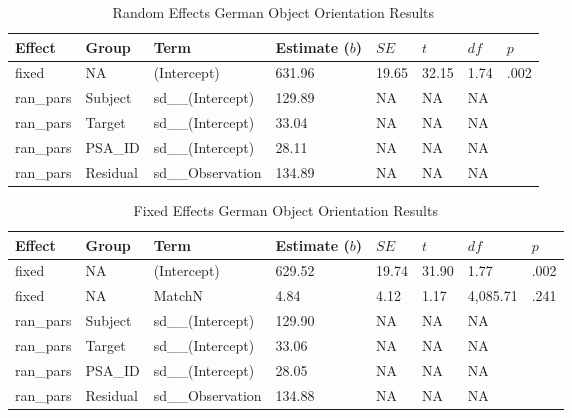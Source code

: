 \documentclass[
  man,mask,floatsintext]{apa7}
\begin{document}
\begin{table}[tbp]

\begin{center}
\begin{threeparttable}

\caption{\label{tab:german-random}Random Effects German Object Orientation Results}

\begin{tabular}{llllllll}
\toprule
Effect & Group & Term & Estimate ($b$) & $SE$ & $t$ & $df$ & $p$\\
\midrule
fixed & NA & (Intercept) & 631.96 & 19.65 & 32.15 & 1.74 & .002\\
ran\_pars & Subject & sd\_\_(Intercept) & 129.89 & NA & NA & NA & \\
ran\_pars & Target & sd\_\_(Intercept) & 33.04 & NA & NA & NA & \\
ran\_pars & PSA\_ID & sd\_\_(Intercept) & 28.11 & NA & NA & NA & \\
ran\_pars & Residual & sd\_\_Observation & 134.89 & NA & NA & NA & \\
\bottomrule
\end{tabular}

\end{threeparttable}
\end{center}

\end{table}

\begin{table}[tbp]

\begin{center}
\begin{threeparttable}

\caption{\label{tab:german-fixed}Fixed Effects German Object Orientation Results}

\begin{tabular}{llllllll}
\toprule
Effect & Group & Term & Estimate ($b$) & $SE$ & $t$ & $df$ & $p$\\
\midrule
fixed & NA & (Intercept) & 629.52 & 19.74 & 31.90 & 1.77 & .002\\
fixed & NA & MatchN & 4.84 & 4.12 & 1.17 & 4,085.71 & .241\\
ran\_pars & Subject & sd\_\_(Intercept) & 129.90 & NA & NA & NA & \\
ran\_pars & Target & sd\_\_(Intercept) & 33.06 & NA & NA & NA & \\
ran\_pars & PSA\_ID & sd\_\_(Intercept) & 28.05 & NA & NA & NA & \\
ran\_pars & Residual & sd\_\_Observation & 134.88 & NA & NA & NA & \\
\bottomrule
\end{tabular}

\end{threeparttable}
\end{center}

\end{table}
\end{document}
